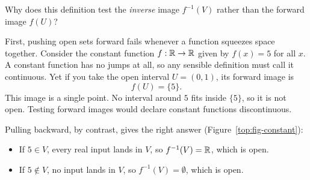 Why does this definition test the \emph{inverse} image $f^{-1}(V)$ rather than the forward image $f(U)$?

First, pushing open sets forward fails whenever a function squeezes space together. Consider the constant function $f: \mathbb{R} \to \mathbb{R}$ given by $f(x) = 5$ for all $x$. A constant function has no jumps at all, so any sensible definition must call it continuous. Yet if you take the open interval $U = (0, 1)$, its forward image is
\[
f(U) = \{5\}.
\]
This image is a single point. No interval around $5$ fits inside $\{5\}$, so it is not open. Testing forward images would declare constant functions discontinuous.

Pulling backward, by contrast, gives the right answer (Figure~\ref{top:fig-constant}):
\begin{itemize}
\item If $5 \in V$, every real input lands in $V$, so $f^{-1}(V) = \mathbb{R}$, which is open.
\item If $5 \notin V$, no input lands in $V$, so $f^{-1}(V) = \emptyset$, which is open.
\end{itemize}

